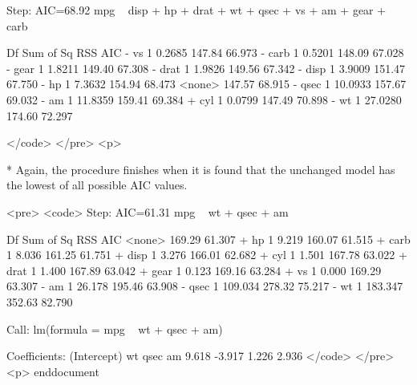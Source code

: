 Step:  AIC=68.92
mpg ~ disp + hp + drat + wt + qsec + vs + am + gear + carb

       Df Sum of Sq    RSS    AIC
- vs    1    0.2685 147.84 66.973
- carb  1    0.5201 148.09 67.028
- gear  1    1.8211 149.40 67.308
- drat  1    1.9826 149.56 67.342
- disp  1    3.9009 151.47 67.750
- hp    1    7.3632 154.94 68.473
<none>              147.57 68.915
- qsec  1   10.0933 157.67 69.032
- am    1   11.8359 159.41 69.384
+ cyl   1    0.0799 147.49 70.898
- wt    1   27.0280 174.60 72.297


</code>
</pre>
<p>


         * Again, the procedure finishes when it is found that the unchanged model has the lowest of all possible AIC values.

<pre>
<code>
Step:  AIC=61.31
mpg ~ wt + qsec + am

       Df Sum of Sq    RSS    AIC
<none>              169.29 61.307
+ hp    1     9.219 160.07 61.515
+ carb  1     8.036 161.25 61.751
+ disp  1     3.276 166.01 62.682
+ cyl   1     1.501 167.78 63.022
+ drat  1     1.400 167.89 63.042
+ gear  1     0.123 169.16 63.284
+ vs    1     0.000 169.29 63.307
- am    1    26.178 195.46 63.908
- qsec  1   109.034 278.32 75.217
- wt    1   183.347 352.63 82.790

Call:
lm(formula = mpg ~ wt + qsec + am)

Coefficients:
(Intercept)           wt         qsec           am
      9.618       -3.917        1.226        2.936
</code>
</pre>
<p>
end{document} 
